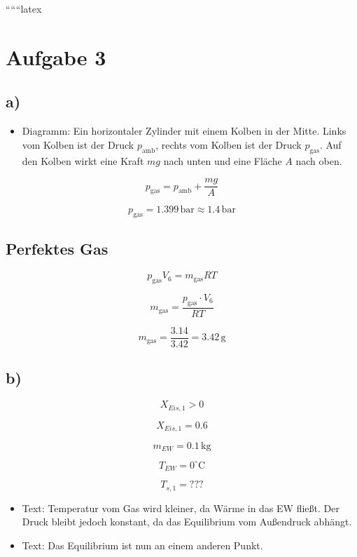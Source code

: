 
``````latex


\section*{Aufgabe 3}

\subsection*{a)}

\begin{itemize}
    \item Diagramm: Ein horizontaler Zylinder mit einem Kolben in der Mitte. Links vom Kolben ist der Druck $p_\text{amb}$, rechts vom Kolben ist der Druck $p_\text{gas}$. Auf den Kolben wirkt eine Kraft $mg$ nach unten und eine Fläche $A$ nach oben.
\end{itemize}

\[
p_\text{gas} = p_\text{amb} + \frac{mg}{A}
\]

\[
p_\text{gas} = 1.399 \, \text{bar} \approx 1.4 \, \text{bar}
\]

\subsection*{Perfektes Gas}

\[
p_\text{gas} V_6 = m_\text{gas} RT
\]

\[
m_\text{gas} = \frac{p_\text{gas} \cdot V_6}{RT}
\]

\[
m_\text{gas} = \frac{3.14}{3.42} = 3.42 \, \text{g}
\]

\subsection*{b)}

\[
X_{Eis,1} > 0
\]

\[
X_{Eis,1} = 0.6
\]

\[
m_{EW} = 0.1 \, \text{kg}
\]

\[
T_{EW} = 0^\circ \text{C}
\]

\[
T_{s,1} = ???
\]

\begin{itemize}
    \item Text: Temperatur vom Gas wird kleiner, da Wärme in das EW fließt. Der Druck bleibt jedoch konstant, da das Equilibrium vom Außendruck abhängt.
    \item Text: Das Equilibrium ist nun an einem anderen Punkt.
\end{itemize}

